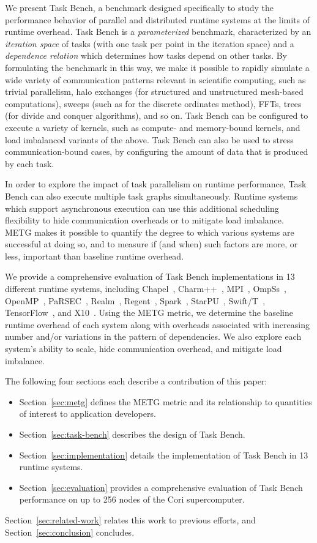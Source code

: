 We present Task Bench, a benchmark designed specifically to study the
performance behavior of parallel and distributed runtime systems at
the limits of runtime overhead. Task Bench is a \emph{parameterized}
benchmark, characterized by an \emph{iteration space} of tasks (with
one task per point in the iteration space) and a \emph{dependence
  relation} which determines how tasks depend on other tasks. By
formulating the benchmark in this way, we make it possible to rapidly
simulate a wide variety of communication patterns relevant in
scientific computing, such as trivial parallelism, halo exchanges (for
structured and unstructured mesh-based computations), sweeps (such as
for the discrete ordinates method), FFTs, trees (for divide and
conquer algorithms), and so on. Task Bench can be configured to
execute a variety of kernels, such as compute- and memory-bound
kernels, and load imbalanced variants of the above. Task Bench can
also be used to stress communication-bound cases, by configuring the
amount of data that is produced by each task.

In order to explore the impact of task parallelism on runtime
performance, Task Bench can also execute multiple task graphs
simultaneously. Runtime systems which support asynchronous execution
can use this additional scheduling flexibility to hide communication
overheads or to mitigate load imbalance. METG makes it possible to
quantify the degree to which various systems are successful at doing
so, and to measure if (and when) such factors are more, or less,
important than baseline runtime overhead.

We provide a comprehensive evaluation of Task Bench implementations in
13 different runtime systems, including Chapel~\cite{Chapel07},
Charm++~\cite{Charmpp93}, MPI~\cite{MPI}, OmpSs~\cite{OmpSs11},
OpenMP~\cite{OpenMPSpec40}, PaRSEC~\cite{PARSEC13},
Realm~\cite{Realm14}, Regent~\cite{Regent15}, Spark~\cite{Spark10},
StarPU~\cite{StarPU11}, Swift/T~\cite{Wozniak13},
TensorFlow~\cite{TensorFlow15}, and X10~\cite{X1005}. Using the METG
metric, we determine the baseline runtime overhead of each system
along with overheads associated with increasing number and/or
variations in the pattern of dependencies. We also explore each
system's ability to scale, hide communication overhead, and mitigate
load imbalance.

The following four sections each describe a contribution of this
paper:

\begin{itemize}
\item Section~\ref{sec:metg} defines the METG metric and its
  relationship to quantities of interest to application developers.
\item Section~\ref{sec:task-bench} describes the design of Task Bench.
\item Section~\ref{sec:implementation} details the implementation of
  Task Bench in 13 runtime systems.
\item Section~\ref{sec:evaluation} provides a comprehensive evaluation
  of Task Bench performance on up to 256 nodes of the Cori
  supercomputer.
\end{itemize}

Section~\ref{sec:related-work} relates this work to previous efforts,
and Section~\ref{sec:conclusion} concludes.
